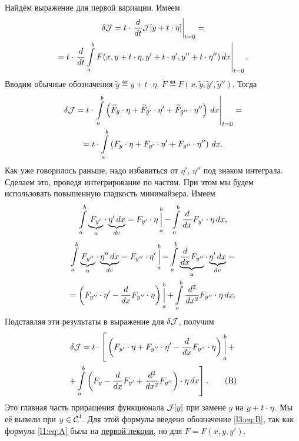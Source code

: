 Найдём выражение для первой вариации. Имеем
\begin{multline*}
	\delta\mathcal{J}=t\cdot\left.\frac{d}{dt}\mathcal{J}[y+t\cdot\eta]\right|_{t=0}=\\=t\cdot\left.\frac{d}{dt}\int\limits_a^b F(x,y+t\cdot\eta,y'+t\cdot\eta',y''+t\cdot\eta'')\,dx\right|_{t=0}.
\end{multline*}
Вводим обычные обозначения $\tilde{y}\eqdef y+t\cdot\eta$, $\widetilde{F}\eqdef F(x,\tilde{y},\tilde{y}',\tilde{y}'')$. Тогда 
\begin{multline*}
	\delta\mathcal{J}=t\cdot\left.\int\limits_a^b\left( \widetilde{F}_{\tilde{y}}\cdot\eta+\widetilde{F}_{\tilde{y}'}\cdot\eta'+\widetilde{F}_{\tilde{y}''}\cdot\eta''\right)\,dx\right|_{t=0}=\\=t\cdot\int\limits_a^b \left(F_{y}\cdot\eta+F_{y'}\cdot\eta'+F_{y''}\cdot\eta''\right)\,dx.
\end{multline*}
Как уже говорилось раньше, надо избавиться от $\eta'$, $\eta''$ под знаком интеграла. Сделаем это, проведя интегрирование по частям. При этом мы будем использовать повышенную гладкость минимайзера. Имеем
\begin{equation*}
	\int\limits_a^b \underbrace{F_{y'}}_{u}\cdot\underbrace{\eta'\,dx}_{dv}=F_{y'}\cdot\eta\mathop{\Big|}\limits_a^b-\int\limits_a^b\frac{d}{dx}F_{y'}\cdot\eta\,dx,
\end{equation*}
\begin{multline*}
	\int\limits_a^b \underbrace{F_{y''}}_{u}\cdot\underbrace{\eta''\,dx}_{dv}=F_{y''}\cdot\eta'\mathop{\Big|}\limits_a^b-\int\limits_a^b\underbrace{\frac{d}{dx}F_{y''}}_{u}\cdot\underbrace{\eta'\,dx}_{dv}=\\=\left(F_{y''}\cdot\eta'-\frac{d}{dx}F_{y''}\cdot\eta\right)\mathop{\Big|}\limits_a^b+\int\limits_a^b\frac{d^2}{dx^2}F_{y''}\cdot\eta\,dx.
\end{multline*}
Подставляя эти результаты в выражение для $\delta\mathcal{J}$, получим 
\begin{multline}
	\label{l3:eq:B}
	\delta\mathcal{J}=t\cdot\left[\vphantom{\int\limits_a^b}\left(F_{y'}\cdot\eta+F_{y''}\cdot\eta'-\frac{d}{dx}F_{y''}\cdot\eta\right)\mathop{\Big|}\limits_a^b+\right.\\\left.+\int\limits_a^b\left(F_{y}-\frac{d}{dx}F_{y'}+\frac{d^2}{dx^2}F_{y''}\right)\cdot\eta\,dx\right].\tag{B}
\end{multline}
Это главная часть приращения функционала $\mathcal{J}[y]$ при замене $y$ на $y\?+t\cdot\eta$. Мы её вывели при $y\in\mathcal{C}{\mathstrut}^{4}_{}$. Для этой формулы введено обозначение \eqref{l3:eq:B}, так как формула \eqref{l1:eq:A} была на \hyperref[lecture1]{первой лекции}, но для $F=F(x,y,y')$. 

